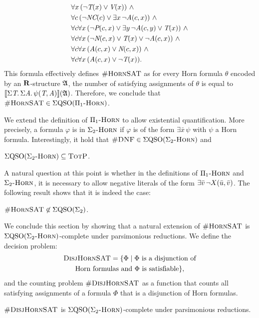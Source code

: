 \begin{example}
\begin{align*}
&\forall x \, (\neg \pT(x) \vee \pV(x)) \ \wedge\\
&\forall c \, (\neg \textit{NC}(c) \vee \exists x \, \neg \textit{A}(c,x)) \ \wedge\\
&\forall c \forall x \, (\neg \textit{P}(c,x) \vee \exists y \, \neg \textit{A}(c,y) \vee \textit{T}(x)) \ \wedge\\
&\forall c \forall x \, (\neg \textit{N}(c,x) \vee \textit{T}(x) \vee \neg \textit{A}(c,x)) \ \wedge\\
&\forall c \forall x \, (\textit{A}(c,x) \vee \textit{N}(c,x)) \ \wedge\\
&\forall c \forall x \, (\textit{A}(c,x) \vee \neg\textit{T}(x)).
\end{align*}
This formula effectively defines $\textsc{\#HornSAT}$
as for every Horn formula $\theta$ encoded by an $\mathbf{R}$-structure $\mathfrak{A}$, the number of satisfying assignments of $\theta$ is equal to ${\llbracket{}{\Sigma{\textit{T}}.\, \Sigma{\textit{A}}.\, \psi(\textit{T},\textit{A})}\rrbracket}(\mathfrak{A})$.  Therefore, we conclude that $\textsc{\#HornSAT} \in \Sigma{\rm QSO}(\Pi_1\textsc{-Horn})$. 
\end{example}
We extend the definition of $\Pi_1\textsc{-Horn}$ to allow existential quantification. More precisely, a formula $\varphi$ is in $\Sigma_2\textsc{-Horn}$ if $\varphi$ is of the form $\exists \bar x \, \psi$ with $\psi$ a Horn formula. Interestingly, it hold that $\textsc{\#DNF} \in \Sigma{\rm QSO}(\Sigma_2\textsc{-Horn})$ and

\begin{proposition}\label{prop-ehorn-pe}
$\Sigma{\rm QSO}(\Sigma_2\textsc{-Horn}) \subseteq \text{\sc TotP}$.
\end{proposition}
A natural question at this point is whether in the definitions of $\Pi_1\textsc{-Horn}$ and $\Sigma_2\textsc{-Horn}$, it is necessary to allow negative literals of the form $\exists \bar{v} \, \neg X(\bar{u},\bar{v})$. The following result shows that it is indeed the case:

\begin{proposition}\label{prop-hsat-not-sigma2}
$\textsc{\#HornSAT} \not\in \Sigma{\rm QSO}(\Sigma_{2})$.
\end{proposition}
We conclude this section by showing that a natural extension of $\textsc{\#HornSAT}$ is $\Sigma{\rm QSO}(\Sigma_2\textsc{-Horn})$-complete under parsimonious reductions. We define the decision problem:
\begin{multline*}
\textsc{DisjHornSAT} = \{\Phi \mid \Phi \text{ is a disjunction of}\\  \text{Horn formulas and $\Phi$ is satisfiable}\},
\end{multline*}
and the counting problem $\textsc{\#DisjHornSAT}$ as a function that counts all satisfying assignments of a formula $\Phi$ that is a disjunction of Horn formulas.

\begin{theorem} \label{sigma2hard}
	$\textsc{\#DisjHornSAT}$ is $\Sigma{\rm QSO}(\Sigma_2\textsc{-Horn})$-complete under parsimonious reductions. 
\end{theorem}